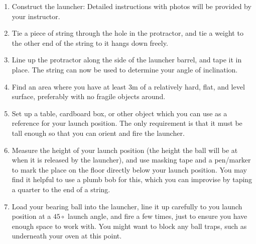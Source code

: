 \begin{enumerate}
    \item Construct the launcher: Detailed instructions with photos will be provided by your instructor.
    \item Tie a piece of string through the hole in the protractor, and tie a weight to the other end of the string to it hangs down freely.
    \item Line up the protractor along the side of the launcher barrel, and tape it in place.  The string can now be used to determine your angle of inclination.
    \item Find an area where you have at least 3m of a relatively hard, flat, and level surface, preferably with no fragile objects around.
    \item Set up a table, cardboard box, or other object which you can use as a reference for your launch position.  The only requirement is that it must be tall enough so that you can orient and fire the launcher.
    \item Measure the height of your launch position (the height the ball will be at when it is released by the launcher), and use masking tape and a pen/marker to mark the place on the floor directly below your launch position.  You may find it helpful to use a plumb bob for this, which you can improvise by taping a quarter to the end of a string.
    \item Load your bearing ball into the launcher, line it up carefully to you launch position at a $45\circ$ launch angle, and fire a few times, just to ensure you have enough space to work with.  You might want to block any ball traps, such as underneath your oven at this point.
\end{enumerate}



